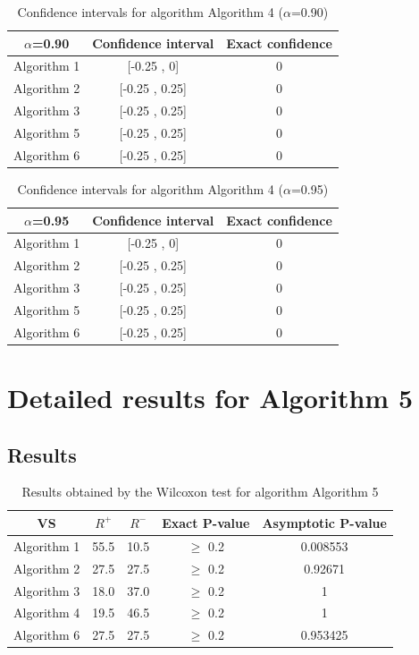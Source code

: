 \documentclass[a4paper,10pt]{article}
\begin{document}
\begin{table}[!htp]
\centering\small
\begin{tabular}{
|c|c|c|}
\hline
 $\alpha$=0.90 & Confidence interval & Exact confidence \\ \hline 
Algorithm 1 & [-0.25 , 0] & 0\\ \hline 
Algorithm 2 & [-0.25 , 0.25] & 0\\ \hline 
Algorithm 3 & [-0.25 , 0.25] & 0\\ \hline 
Algorithm 5 & [-0.25 , 0.25] & 0\\ \hline 
Algorithm 6 & [-0.25 , 0.25] & 0\\ \hline 

\end{tabular}
\caption{Confidence intervals for algorithm Algorithm 4 ($\alpha$=0.90)}
\end{table}
\begin{table}[!htp]
\centering\small
\begin{tabular}{
|c|c|c|}
\hline
 $\alpha$=0.95 & Confidence interval & Exact confidence \\ \hline 
Algorithm 1 & [-0.25 , 0] & 0\\ \hline 
Algorithm 2 & [-0.25 , 0.25] & 0\\ \hline 
Algorithm 3 & [-0.25 , 0.25] & 0\\ \hline 
Algorithm 5 & [-0.25 , 0.25] & 0\\ \hline 
Algorithm 6 & [-0.25 , 0.25] & 0\\ \hline 

\end{tabular}
\caption{Confidence intervals for algorithm Algorithm 4 ($\alpha$=0.95)}
\end{table}

 \clearpage 


\section{Detailed results for Algorithm 5}


\subsection{Results}

\begin{table}[!htp]
\centering\small
\begin{tabular}{
|c|c|c|c|c|}
\hline
 VS & $R^{+}$ & $R^{-}$ & Exact P-value & Asymptotic P-value \\ \hline 
Algorithm 1 & 55.5 & 10.5 & $\geq$ 0.2 & 0.008553\\ \hline 
Algorithm 2 & 27.5 & 27.5 & $\geq$ 0.2 & 0.92671\\ \hline 
Algorithm 3 & 18.0 & 37.0 & $\geq$ 0.2 & 1\\ \hline 
Algorithm 4 & 19.5 & 46.5 & $\geq$ 0.2 & 1\\ \hline 
Algorithm 6 & 27.5 & 27.5 & $\geq$ 0.2 & 0.953425\\ \hline 

\end{tabular}
\caption{Results obtained by the Wilcoxon test for algorithm Algorithm 5}
\end{table}
\end{document}
